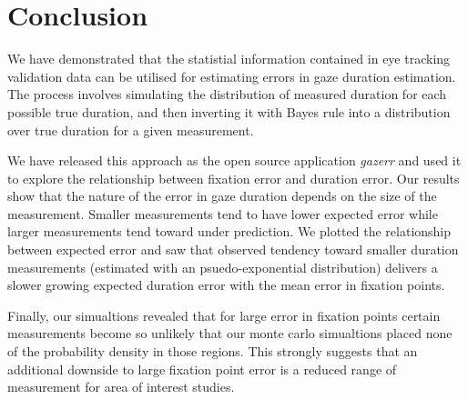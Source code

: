 \documentclass[12pt,a4paper]{article}
\numberwithin{equation}{section}
\begin{document}
\section{Conclusion}

We have demonstrated that the statistial information contained in eye tracking validation
data can be utilised for estimating errors in gaze duration estimation. The process involves
simulating the distribution of measured duration for each possible true duration, 
and then inverting it with Bayes rule into a distribution over true duration for a given measurement.

We have released this approach as the open source application \textit{gazerr} and used it to explore
the relationship between fixation error and duration error. Our results show that the nature
of the error in gaze duration depends on the size of the measurement. Smaller measurements
tend to have lower expected error while larger measurements tend toward under prediction. We plotted
the relationship between expected error and saw that observed tendency toward smaller duration
measurements (estimated with an psuedo-exponential distribution) delivers a slower growing
expected duration error with the mean error in fixation points.

Finally, our simualtions revealed that for large error in fixation points certain measurements
become so unlikely that our monte carlo simualtions placed none of the probability density
in those regions. This strongly suggests that an additional downside to large fixation point error
is a reduced range of measurement for area of interest studies.




\end{document}

